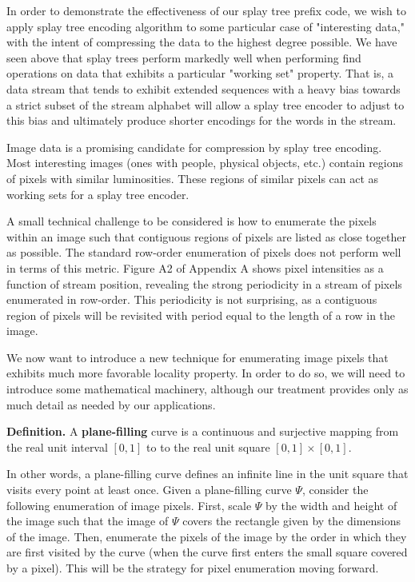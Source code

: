 \documentclass[twoside]{article}
\begin{document}
\begin{multicols}{2}
In order to demonstrate the effectiveness of our splay tree prefix code, we wish to apply splay tree encoding algorithm to some particular case of "interesting data," with the intent of compressing the data to the highest degree possible. We have seen above that splay trees perform markedly well when performing find operations on data that exhibits a particular "working set" property. That is, a data stream that tends to exhibit extended sequences with a heavy bias towards a strict subset of the stream alphabet will allow a splay tree encoder to adjust to this bias and ultimately produce shorter encodings  for the words in the stream.

Image data is a promising candidate for compression by splay tree encoding. Most interesting images (ones with people, physical objects, etc.) contain regions of pixels with similar luminosities. These regions of similar pixels can act as working sets for a splay tree encoder.

A small technical challenge to be considered is how to enumerate the pixels within an image such that contiguous regions of pixels are listed as close together as possible. The standard row-order enumeration of pixels does not perform well in terms of this metric. Figure A2 of Appendix A shows pixel intensities as a function of stream position, revealing the strong periodicity in a stream of pixels enumerated in row-order. This periodicity is not surprising, as a contiguous region of pixels will be revisited with period equal to the length of a row in the image.

We now want to introduce a new technique for enumerating image pixels that exhibits much more favorable locality property. In order to do so, we will need to introduce some mathematical machinery, although our treatment provides only as much detail as needed by our applications.

\vspace{0.5em}
\textbf{Definition. } A \textbf{plane-filling} curve is a continuous and surjective mapping from the real unit interval $[0, 1]$ to to the real unit square $[0, 1] \times [0, 1]$.

\vspace{0.5em}
In other words, a plane-filling curve defines an infinite line in the unit square that visits every point at least once. Given a plane-filling curve $\Psi$, consider the following enumeration of image pixels. First, scale $\Psi$ by the width and height of the image such that the image of $\Psi$ covers the rectangle given by the dimensions of the image. Then, enumerate the pixels of the image by the order in which they are first visited by the curve (when the curve first enters the small square covered by a pixel). This will be the strategy for pixel enumeration moving forward.


\end{multicols}
\end{document}
